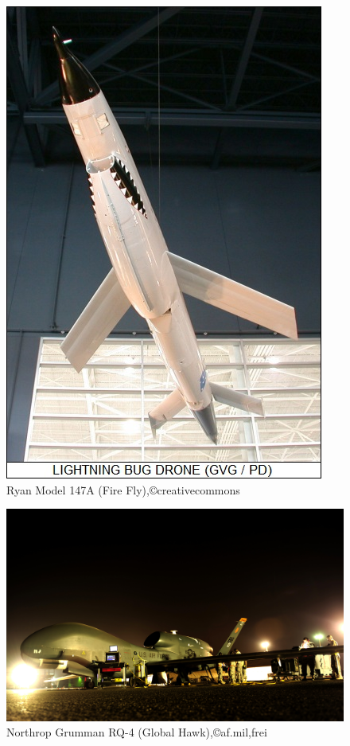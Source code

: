 \begin{figure}[p]
\begin{center}
\includegraphics[scale=0.5]{img/fire_fly.jpg}
\caption{Ryan Model 147A (Fire Fly),©creativecommons}
\label{fire fly}
\end{center}
\end{figure}

\begin{figure}[p]
\begin{small}
\includegraphics[scale=0.4]{img/rq-4b.jpg}
\caption{Northrop Grumman RQ-4 (Global Hawk),©af.mil,frei}
\label{global hawk}
\end{small}
\end{figure}

